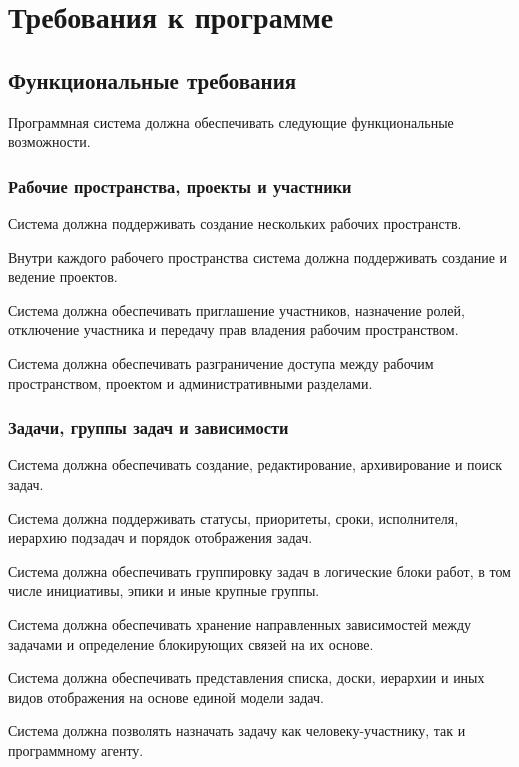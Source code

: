 \section{Требования к программе}

\subsection{Функциональные требования}

\headingtextsep

Программная система должна обеспечивать следующие функциональные возможности.

\subsubsection{Рабочие пространства, проекты и участники}

Система должна поддерживать создание нескольких рабочих пространств.

Внутри каждого рабочего пространства система должна поддерживать создание и ведение проектов.

Система должна обеспечивать приглашение участников, назначение ролей, отключение участника и передачу прав владения рабочим пространством.

Система должна обеспечивать разграничение доступа между рабочим пространством, проектом и административными разделами.

\subsubsection{Задачи, группы задач и зависимости}

Система должна обеспечивать создание, редактирование, архивирование и поиск задач.

Система должна поддерживать статусы, приоритеты, сроки, исполнителя, иерархию подзадач и порядок отображения задач.

Система должна обеспечивать группировку задач в логические блоки работ, в том числе инициативы, эпики и иные крупные группы.

Система должна обеспечивать хранение направленных зависимостей между задачами и определение блокирующих связей на их основе.

Система должна обеспечивать представления списка, доски, иерархии и иных видов отображения на основе единой модели задач.

Система должна позволять назначать задачу как человеку-участнику, так и программному агенту.


